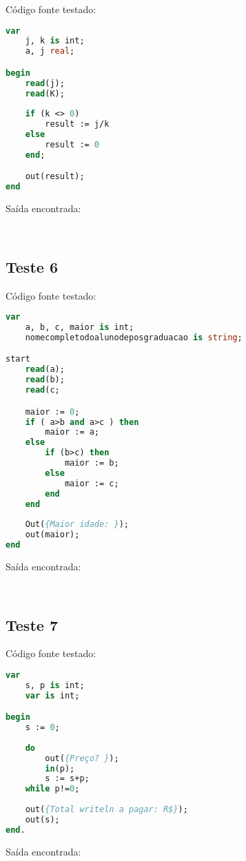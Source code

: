 \documentclass[11pt]{article}
\begin{document}
Código fonte testado:
\begin{lstlisting}[language=Pascal]
var
	j, k is int;
	a, j real;

begin
	read(j);
	read(K);
	
	if (k <> 0)
		result := j/k
	else
		result := 0
	end;

 	out(result);
end
\end{lstlisting}
	
Saída encontrada:
\begin{verbatim}
	
\end{verbatim}




\subsection{Teste 6}

Código fonte testado:
\begin{lstlisting}[language=Pascal]
var
	a, b, c, maior is int;
	nomecompletodoalunodeposgraduacao is string;

start
	read(a);
	read(b);
	read(c;

	maior := 0;
	if ( a>b and a>c ) then
		maior := a;
	else
		if (b>c) then
			maior := b;
		else
			maior := c;
		end
	end
	
	Out({Maior idade: });
	out(maior);
end
\end{lstlisting}
	
Saída encontrada:
\begin{verbatim}
	
\end{verbatim}




\subsection{Teste 7}

Código fonte testado:
\begin{lstlisting}[language=Pascal]
var
    s, p is int;
    var is int;

begin
    s := 0;
    
    do
        out({Preço? });
        in(p);
        s := s+p;
    while p!=0;
    
    out({Total writeln a pagar: R$});
    out(s);
end.
\end{lstlisting}
	
Saída encontrada:
\begin{verbatim}
	
\end{verbatim}
\end{document}
